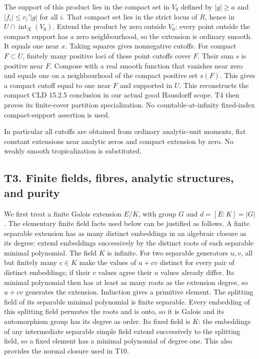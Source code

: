 \documentclass[
  10pt,
]{article}
\begin{document}
The support of this product lies in the compact set in \(V_0\) defined
by \(|g|\ge a\) and \(|f_i|\le r_i'|g|\) for all \(i\). That compact set
lies in the strict locus of \(R\), hence in
\(U\cap\operatorname{int}_X(V_0)\). Extend the product by zero outside
\(V_0\): every point outside the compact support has a zero
neighbourhood, so the extension is ordinary smooth. It equals one near
\(x\). Taking squares gives nonnegative cutoffs. For compact
\(F\subset U\), finitely many positive loci of these point cutoffs cover
\(F\). Their sum \(s\) is positive near \(F\). Compose with a real
smooth function that vanishes near zero and equals one on a
neighbourhood of the compact positive set \(s(F)\). This gives a compact
cutoff equal to one near \(F\) and supported in \(U\). This reconstructs
the compact CLD 15.2.5 conclusion in our actual good Hausdorff scope. T4
then proves its finite-cover partition specialization. No
countable-at-infinity fixed-index compact-support assertion is used.

In particular all cutoffs are obtained from ordinary analytic-unit
moments, flat constant extensions near analytic zeros and compact
extension by zero. No weakly smooth tropicalization is substituted.

\subsection{T3. Finite fields, fibres, analytic structures, and
purity}\label{t3.-finite-fields-fibres-analytic-structures-and-purity}

We first treat a finite Galois extension \(E/K\), with group \(G\) and
\(d=[E:K]=|G|\). The elementary finite field facts used below can be
justified as follows. A finite separable extension has as many distinct
embeddings in an algebraic closure as its degree: extend embeddings
successively by the distinct roots of each separable minimal polynomial.
The field \(K\) is infinite. For two separable generators \(u,v\), all
but finitely many \(c\in K\) make the values of \(u+cv\) distinct for
every pair of distinct embeddings; if their \(v\) values agree their
\(u\) values already differ. Its minimal polynomial then has at least as
many roots as the extension degree, so \(u+cv\) generates the extension.
Induction gives a primitive element. The splitting field of its
separable minimal polynomial is finite separable. Every embedding of
this splitting field permutes the roots and is onto, so it is Galois and
its automorphism group has its degree as order. Its fixed field is
\(K\): the embeddings of any intermediate separable simple field extend
successively to the splitting field, so a fixed element has a minimal
polynomial of degree one. This also provides the normal closure used in
T10.
\end{document}
